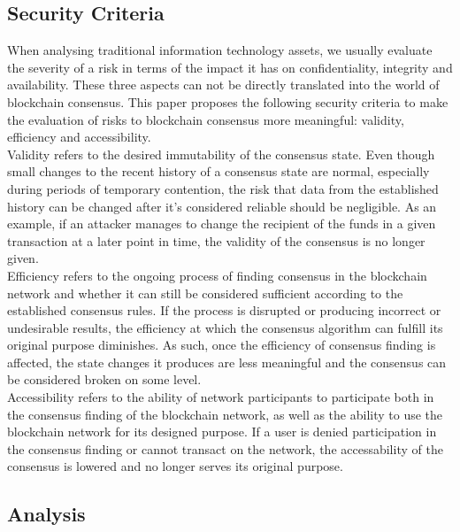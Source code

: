 \documentclass[11pt,a4paper,draft]{article}
\begin{document}
\subsection{Security Criteria}

When analysing traditional information technology assets, we usually evaluate the severity of a risk in terms of the impact it has on confidentiality, integrity and availability. These three aspects can not be directly translated into the world of blockchain consensus. This paper proposes the following security criteria to make the evaluation of risks to blockchain consensus more meaningful: validity, efficiency and accessibility.\\

Validity refers to the desired immutability of the consensus state. Even though small changes to the recent history of a consensus state are normal, especially during periods of temporary contention, the risk that data from the established history can be changed after it's considered reliable should be negligible. As an example, if an attacker manages to change the recipient of the funds in a given transaction at a later point in time, the validity of the consensus is no longer given.\\

Efficiency refers to the ongoing process of finding consensus in the blockchain network and whether it can still be considered sufficient according to the established consensus rules. If the process is disrupted or producing incorrect or undesirable results, the efficiency at which the consensus algorithm can fulfill its original purpose diminishes. As such, once the efficiency of consensus finding is affected, the state changes it produces are less meaningful and the consensus can be considered broken on some level.\\

Accessibility refers to the ability of network participants to participate both in the consensus finding of the blockchain network, as well as the ability to use the blockchain network for its designed purpose. If a user is denied participation in the consensus finding or cannot transact on the network, the accessability of the consensus is lowered and no longer serves its original purpose.\\

\subsection{Analysis}
\end{document}

